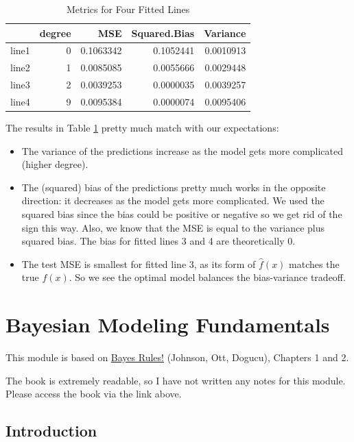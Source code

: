 \documentclass[
]{book}
\providecommand{\tightlist}{%
  \setlength{\itemsep}{0pt}\setlength{\parskip}{0pt}}
\begin{document}
\begin{table}

\caption{\label{tab:10-table}Metrics for Four Fitted Lines}
\centering
\begin{tabular}[t]{l|r|r|r|r}
\hline
  & degree & MSE & Squared.Bias & Variance\\
\hline
line1 & 0 & 0.1063342 & 0.1052441 & 0.0010913\\
\hline
line2 & 1 & 0.0085085 & 0.0055666 & 0.0029448\\
\hline
line3 & 2 & 0.0039253 & 0.0000035 & 0.0039257\\
\hline
line4 & 9 & 0.0095384 & 0.0000074 & 0.0095406\\
\hline
\end{tabular}
\end{table}

The results in Table \ref{tab:10-table} pretty much match with our expectations:

\begin{itemize}
\tightlist
\item
  The variance of the predictions increase as the model gets more complicated (higher degree).
\item
  The (squared) bias of the predictions pretty much works in the opposite direction: it decreases as the model gets more complicated. We used the squared bias since the bias could be positive or negative so we get rid of the sign this way. Also, we know that the MSE is equal to the variance plus squared bias. The bias for fitted lines 3 and 4 are theoretically 0.
\item
  The test MSE is smallest for fitted line 3, as its form of \(\hat{f}(x)\) matches the true \(f(x)\). So we see the optimal model balances the bias-variance tradeoff.
\end{itemize}

\hypertarget{bayesian-modeling-fundamentals}{%
\chapter{Bayesian Modeling Fundamentals}\label{bayesian-modeling-fundamentals}}

This module is based on \href{https://www.bayesrulesbook.com/}{Bayes Rules!} (Johnson, Ott, Dogucu), Chapters 1 and 2.

The book is extremely readable, so I have not written any notes for this module. Please access the book via the link above.

\hypertarget{introduction-7}{%
\section{Introduction}\label{introduction-7}}
\end{document}

